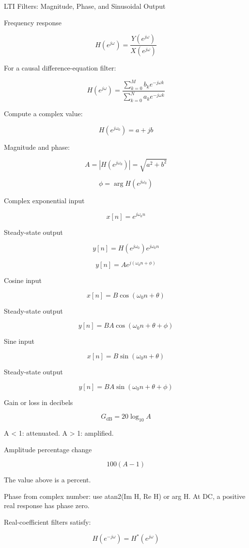 LTI Filters: Magnitude, Phase, and Sinusoidal Output

Frequency response

$$H(e^{j\omega})=\frac{Y(e^{j\omega})}{X(e^{j\omega})}$$

For a causal difference-equation filter:

$$H(e^{j\omega})=\frac{\sum_{k=0}^{M}b_k e^{-j\omega k}}{\sum_{k=0}^{N}a_k e^{-j\omega k}}$$

Compute a complex value:

$$H(e^{j\omega_0})=a+jb$$

Magnitude and phase:

$$A=|H(e^{j\omega_0})|=\sqrt{a^2+b^2}$$

$$\phi=\arg H(e^{j\omega_0})$$

Complex exponential input

$$x[n]=e^{j\omega_0n}$$

Steady-state output

$$y[n]=H(e^{j\omega_0})e^{j\omega_0n}$$

$$y[n]=Ae^{j(\omega_0n+\phi)}$$

Cosine input

$$x[n]=B\cos(\omega_0n+\theta)$$

Steady-state output

$$y[n]=BA\cos(\omega_0n+\theta+\phi)$$

Sine input

$$x[n]=B\sin(\omega_0n+\theta)$$

Steady-state output

$$y[n]=BA\sin(\omega_0n+\theta+\phi)$$

Gain or loss in decibels

$$G_{\text{dB}}=20\log_{10}A$$

A < 1: attenuated. A > 1: amplified.

Amplitude percentage change

$$100(A-1)$$

The value above is a percent.

Phase from complex number: use atan2(Im H, Re H) or arg H. At DC, a positive real response has phase zero.

Real-coefficient filters satisfy:

$$H(e^{-j\omega})=H^*(e^{j\omega})$$
